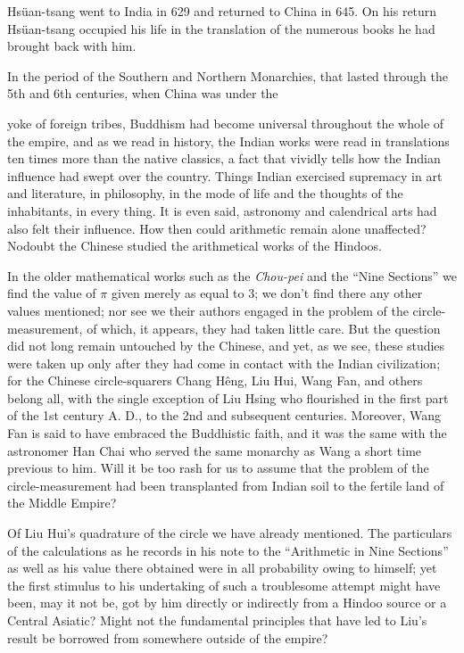\documentclass[11pt]{article}
\newcommand{\scanpage}[2]{\clearpage\setcounter{footnote}{0}\noindent{\footnotesize\color{gray}PDF page #1 · #2}\par\medskip}
\newcommand{\scanfooter}{}
\begin{document}
Hsüan-tsang went to India in 629 and returned to China in 645. On his return Hsüan-tsang occupied his life in the translation of the numerous books he had brought back with him.

In the period of the Southern and Northern Monarchies, that lasted through the 5th and 6th centuries, when China was under the
\scanfooter

\scanpage{0071}{Chapter 9, printed page 57}
yoke of foreign tribes, Buddhism had become universal throughout the whole of the empire, and as we read in history, the Indian works were read in translations ten times more than the native classics, a fact that vividly tells how the Indian influence had swept over the country. Things Indian exercised supremacy in art and literature, in philosophy, in the mode of life and the thoughts of the inhabitants, in every thing. It is even said, astronomy and calendrical arts had also felt their influence. How then could arithmetic remain alone unaffected? Nodoubt the Chinese studied the arithmetical works of the Hindoos.

In the older mathematical works such as the \emph{Chou-pei} and the ``Nine Sections'' we find the value of $\pi$ given merely as equal to 3; we don't find there any other values mentioned; nor see we their authors engaged in the problem of the circle-measurement, of which, it appears, they had taken little care. But the question did not long remain untouched by the Chinese, and yet, as we see, these studies were taken up only after they had come in contact with the Indian civilization; for the Chinese circle-squarers Chang Hêng, Liu Hui, Wang Fan, and others belong all, with the single exception of Liu Hsing who flourished in the first part of the 1st century A. D., to the 2nd and subsequent centuries. Moreover, Wang Fan is said to have embraced the Buddhistic faith, and it was the same with the astronomer Han Chai who served the same monarchy as Wang a short time previous to him. Will it be too rash for us to assume that the problem of the circle-measurement had been transplanted from Indian soil to the fertile land of the Middle Empire?

Of Liu Hui's quadrature of the circle we have already mentioned. The particulars of the calculations as he records in his note to the ``Arithmetic in Nine Sections'' as well as his value there obtained were in all probability owing to himself; yet the first stimulus to his undertaking of such a troublesome attempt might have been, may it not be, got by him directly or indirectly from a Hindoo source or a Central Asiatic? Might not the fundamental principles that have led to Liu's result be borrowed from somewhere outside of the empire?
\end{document}
